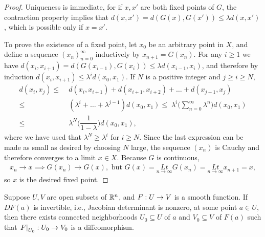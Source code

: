 \documentclass[11pt,a4paper]{article}
\begin{document}
\begin{proof}
Uniqueness is immediate, for if $x,x'$ are both fixed points of $G$, the contraction property implies that $d(x,x') = d(G(x),G(x'))\le \lambda d(x,x')$, which is possible only if $x = x'$.

To prove the existence of a fixed point, let $x_0$ be an arbitrary point in $X$, and define a sequence $(x_n)_{n=0}^\infty$ inductively by $x_{n+1} = G(x_n)$. For any $i\ge 1$ we have $d(x_i,x_{i+1}) = d(G(x_{i-1}),G(x_i))\le \lambda d(x_{i-1},x_i)$, and therefore by induction $d(x_i,x_{i+1})\le \lambda^i d(x_0,x_1)$. If $N$ is a positive integer and $j\ge i\ge N$,
\begin{align*}
d(x_i,x_{j}) \le&\; d(x_i,x_{i+1})+d(x_{i+1},x_{i+2})+\ldots+d(x_{j-1},x_{j}) \\
\le&\; (\lambda^i+\ldots+\lambda^{j-1})d(x_0,x_1) \le\; \lambda^i \Big(\sum_{n=0}^\infty \lambda^n \Big) d(x_0,x_1)\\
\le&\; \lambda^N \Big( \dfrac{1}{1-\lambda}\Big) d(x_0,x_1),
\end{align*}
where we have used that $\lambda^N\ge \lambda^i$ for $i\ge N$. Since the last expression can be made as small as desired by choosing $N$ large, the sequence $(x_n)$ is Cauchy and therefore converges to a limit $x\in X$. Because $G$ is continuous,
\begin{align*}
x_n\rightarrow x \implies G(x_n)\rightarrow G(x), 
\text{ but } G(x) = \underset{n\rightarrow \infty}{Lt} G(x_n) =  \underset{n\rightarrow \infty}{Lt} x_{n+1} = x,
\end{align*}
so $x$ is the desired fixed point.
\end{proof}

\begin{proposition}
Suppose $U, V$ are open subsets of $\mathbb{R}^n$, and $F:U\rightarrow V$ is a smooth function. If $DF(a)$ is invertible, i.e., Jacobian determinant is nonzero, at some point $a\in U$, then there exists connected neighborhoods $U_0\subseteq U$ of $a$ and $V_0\subseteq V$ of $F(a)$ such that $\left.F\right|_{U_0}:U_0\rightarrow V_0$ is a diffeomorphism.
\end{proposition}
\end{document}
